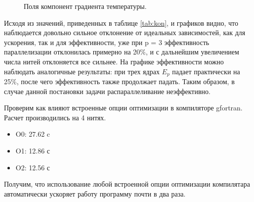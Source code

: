 \begin{figure}[H]
    \centering
    \caption{Поля компонент градиента температуры.}
    \label{fig:last}
\end{figure}

Исходя из значений, приведенных в таблице \ref{tab:kon}, и графиков видно, что
наблюдается довольно сильное отклонение от идеальных зависимостей, как для ускорения,
так и для эффективности, уже при p = 3 эффективность параллелизации отклонилась
примерно на 20\%, и с дальнейшим увеличением числа нитей отклоняется все сильнее. На графике эффективности можно наблюдать аналогичные
результаты: при трех ядрах $E_p$ падает практически на 25\%, после чего
эффективность также продолжает падать. Таким образом, в случае данной
постановки задачи распараллеливание неэффективно.

Проверим как влияют встроенные опции оптимизации в компиляторе gfortran. Расчет производились на 4 нитях.
\begin{itemize}
    \item O0: 27.62 c
    \item O1: 12.86 с
    \item O2: 12.56 с
\end{itemize}

Получим, что использование любой встроенной опции оптимизации компилятара автоматически ускоряет работу программу почти в два раза.

